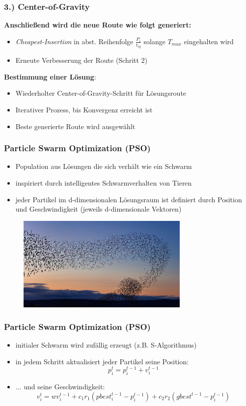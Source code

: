 \documentclass{beamer}
\begin{document}
\begin{frame}
  \frametitle{3.) Center-of-Gravity}
  \textbf{Anschließend wird die neue Route wie folgt generiert:}
  \begin{itemize}
    \item \textit{Cheapest-Insertion} in abst. Reihenfolge $\frac{P_i}{t_{ig}}$ solange $T_{max}$ eingehalten wird
    \item Erneute Verbesserung der Route (Schritt 2)
  \end{itemize}
  \textbf{Bestimmung einer Lösung}:
  \begin{itemize}
    \item Wiederholter Center-of-Gravity-Schritt für Lösungsroute
    \item Iterativer Prozess, bis Konvergenz erreicht ist
    \item Beste generierte Route wird ausgewählt
  \end{itemize}
\end{frame}

\begin{frame}
  \frametitle{Particle Swarm Optimization (PSO)}
  \begin{itemize}
    \item Population aus Lösungen die sich verhält wie ein Schwarm
    \item inspiriert durch intelligentes Schwarmverhalten von Tieren
    \item jeder Partikel im d-dimensionalen Lösungsraum ist definiert durch Position und Geschwindigkeit (jeweils d-dimensionale Vektoren)
  \end{itemize}
  \begin{figure}
    \centering
    \includegraphics[width=0.75\textwidth]{img/birds.jpg}
  \end{figure}
\end{frame}

\begin{frame}
  \frametitle{Particle Swarm Optimization (PSO)}
  \begin{itemize}
  \item initialer Schwarm wird zufällig erzeugt (z.B. S-Algorithmus)
  \item in jedem Schritt aktualisiert jeder Partikel seine Position: \[p_i^{t} = p_i^{t-1} + v_i^{t-1} \]
  \item ... und seine Geschwindigkeit:
  \[ v_i^{t} = w v_i^{t-1} + c_1r_1(pbest_i^{t-1} - p_i^{t-1}) + c_2r_2(gbest^{t-1} - p_i^{t-1})\]
  
  
  \end{itemize}
\end{frame}
\end{document}
